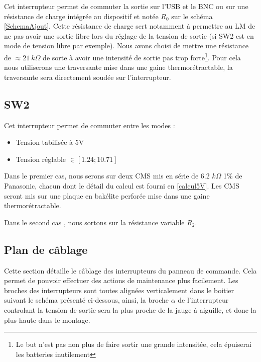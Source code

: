 \documentclass[12pt]{article}
\begin{document}
Cet interrupteur permet de commuter la sortie sur l'USB et le BNC ou sur une résistance de charge intégrée au dispositif
et notée $R_0$ sur le schéma \ref{SchemaAjout}. Cette résistance de charge sert notamment à permettre au LM de ne pas avoir
une sortie libre lors du réglage de la tension de sortie (si SW2 est en mode de tension libre par exemple). Nous avons 
choisi de mettre une résistance de $\approx 21\ k\Omega$ de sorte à avoir une intensité de sortie pas trop forte\footnote{
Le but n'est pas non plus de faire sortir une grande intensitée, cela épuiserai les batteries inutilement}. Pour
cela nous utiliserons une traversante mise dans une gaine thermorétractable, la traversante sera directement soudée 
sur l'interrupteur.

\subsection{SW2}

Cet interrupteur permet de commuter entre les modes :

\begin{itemize}
	\item Tension tabilisée à 5V
	\item Tension réglable $\in [1.24 ; 10.71]$\\
\end{itemize}

Dans le premier cas, nous serons sur deux CMS mis en série de 6.2 $k\Omega$ 1\% de Panasonic, chacun dont 
le détail du calcul est fourni en \ref{calcul5V}. Les CMS seront mis sur une plaque en bakélite perforée mise dans
une gaine thermorétractable.\newline

Dans le second cas , nous sortons sur la résistance variable $R_2$.

\subsection{Plan de câblage}

Cette section détaille le câblage des interrupteurs du panneau de commande. Cela permet de pouvoir effectuer des actions de 
maintenance plus facilement. Les broches des interrupteurs sont toutes alignées verticalement dans le boitier suivant le
schéma présenté ci-dessous, ainsi, la broche $\alpha$ de l'interrupteur controlant la tension de sortie sera la plus proche
de la jauge à aiguille, et donc la plus \og haute \fg dans le montage.\newline
\end{document}
